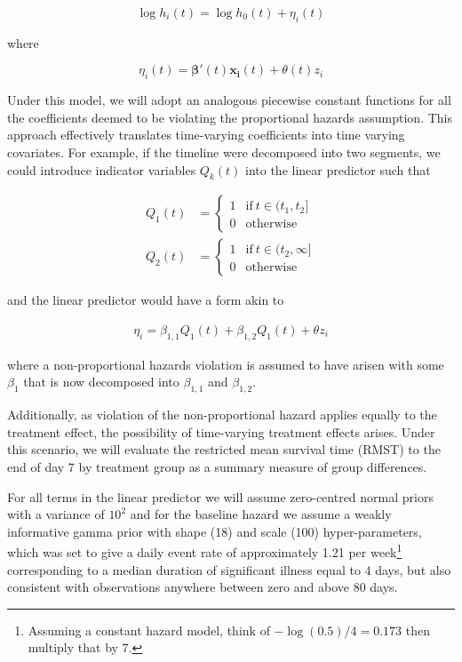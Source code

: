 \documentclass[a4paper]{article}
\begin{document}
\begin{equation}
\log h_i(t) = \log h_0(t) + \eta_i(t)
\end{equation}

where

\begin{equation}
\eta_i(t) = \boldsymbol{\beta}'(t) \boldsymbol{x_i}(t) + \theta(t) z_i
\end{equation}

Under this model, we will adopt an analogous piecewise constant functions for all the coefficients deemed to be violating the proportional hazards assumption.
This approach effectively translates time-varying coefficients into time varying covariates.
For example, if the timeline were decomposed into two segments, we could introduce indicator variables $Q_k(t)$ into the linear predictor such that 

\begin{align*}
Q_1(t) &= \begin{cases}
      1 & \text{if}\ t \in (t_1, t_2] \\
      0 & \text{otherwise}
    \end{cases} \\
Q_2(t) &= \begin{cases}
      1 & \text{if}\ t \in (t_2, \infty] \\
      0 & \text{otherwise}
    \end{cases}    
\end{align*}

and the linear predictor would have a form akin to 

\begin{align*}
\eta_i = \beta_{1, 1} Q_1(t) + \beta_{1, 2} Q_1(t) + \theta z_i
\end{align*}

where a non-proportional hazards violation is assumed to have arisen with some $\beta_1$ that is now decomposed into $\beta_{1, 1}$ and $\beta_{1, 2}$.

Additionally, as violation of the non-proportional hazard applies equally to the treatment effect, the possibility of time-varying treatment effects arises.
Under this scenario, we will evaluate the restricted mean survival time (RMST) to the end of day 7 by treatment group as a summary measure of group differences.

For all terms in the linear predictor we will assume zero-centred normal priors with a variance of $10^2$ and for the baseline hazard we assume a weakly informative gamma prior with shape (18) and scale (100) hyper-parameters, which was set to give a daily event rate of approximately 1.21 per week\footnote{Assuming a constant hazard model, think of $-\log(0.5)/4 = 0.173$ then multiply that by 7.} corresponding to a median duration of significant illness equal to 4 days, but also consistent with observations anywhere between zero and above 80 days.
\end{document}
